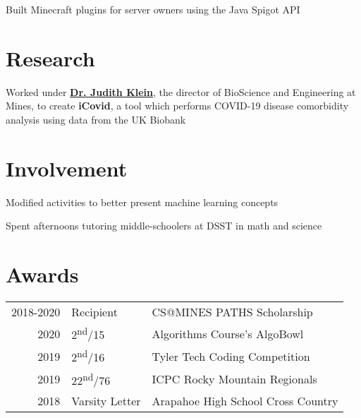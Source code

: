 \documentclass[]{darling-resume-openfont}
\begin{document}
\begin{minipage}[t]{0.66\textwidth}
\begin{tightemize}
\item Built Minecraft plugins for server owners using the Java Spigot API
\end{tightemize}
\sectionsep


\section{Research}
Worked under \textbf{\href{https://chemistry.mines.edu/project/klein-seetharaman-judith/}{Dr. Judith Klein}}, the director of BioScience and Engineering at Mines, to create \textbf{iCovid}, a tool which performs COVID-19 disease comorbidity analysis using data from the UK Biobank
\sectionsep


\section{Involvement}

\begin{tightemize}
\item Modified activities to better present machine learning concepts
\end{tightemize}
\sectionsep

\begin{tightemize}
\item Spent afternoons tutoring middle-schoolers at DSST in math and science
\end{tightemize}


\section{Awards}
\begin{tabular}{rll}
2018-2020 & Recipient & CS@MINES PATHS Scholarship \\
2020 & 2\textsuperscript{nd}/15 & Algorithms Course's AlgoBowl \\
2019 & 2\textsuperscript{nd}/16 & Tyler Tech Coding Competition \\
2019 & 22\textsuperscript{nd}/76 & ICPC Rocky Mountain Regionals \\
2018 & Varsity Letter & Arapahoe High School Cross Country \\
\end{tabular}
\sectionsep


\end{minipage} 
\end{document}
